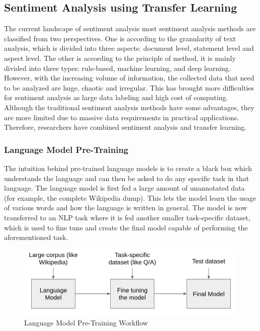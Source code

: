 \documentclass[a4paper, 12pt]{article}
\begin{document}
\begin{sloppypar}
\subsection{Sentiment Analysis using Transfer Learning}

The current landscape of sentiment analysis most sentiment analysis methods are classified from two perspectives. One is according to the granularity of text analysis, which is divided into three aspects: document level, statement level and aspect level. The other is according to the principle of method, it is mainly divided into three types: rule-based, machine learning, and deep learning. However, with the increasing volume of information, the collected data that need to be analyzed are huge, chaotic and irregular. This has brought more difficulties for sentiment analysis as large data labeling and high cost of computing. Although the traditional sentiment analysis methods have some advantages, they are more limited due to massive data requirements in practical applications. Therefore, researchers have combined sentiment analysis and transfer learning. %

\subsubsection{Language Model Pre-Training}

The intuition behind pre-trained language models is to create a black box which understands the language and can then be asked to do any specific task in that language. The language model is first fed a large amount of unannotated data (for example, the complete Wikipedia dump). This lets the model learn the usage of various words and how the language is written in general. The model is now transferred to an NLP task where it is fed another smaller task-specific dataset, which is used to fine tune and create the final model capable of performing the aforementioned task. %

\begin{figure}[H]
\begin{center}
\includegraphics[scale=0.5]{lm.png}
\caption{ Language Model Pre-Training Workflow} %
\end{center}
\end{figure}


\end{sloppypar}
\end{document}
